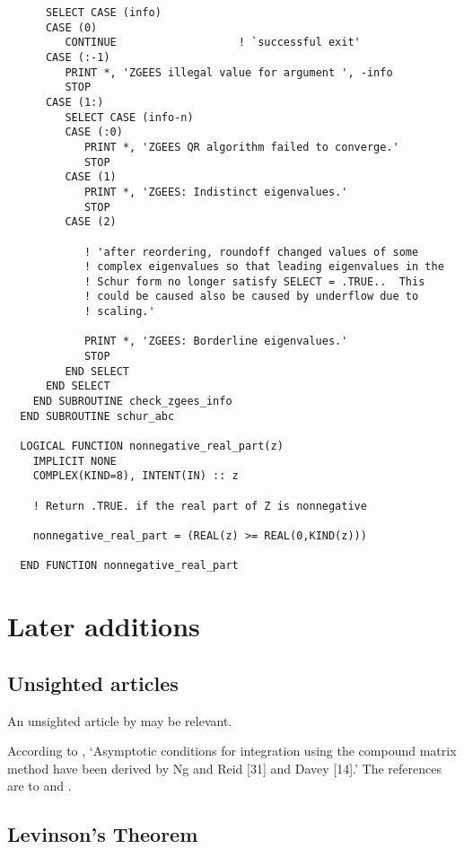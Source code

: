 \documentclass{article}
\begin{document}
\begin{verbatim}
      SELECT CASE (info)
      CASE (0)
         CONTINUE                   ! `successful exit'
      CASE (:-1)
         PRINT *, 'ZGEES illegal value for argument ', -info
         STOP
      CASE (1:)
         SELECT CASE (info-n)
         CASE (:0)
            PRINT *, 'ZGEES QR algorithm failed to converge.'
            STOP
         CASE (1)  
            PRINT *, 'ZGEES: Indistinct eigenvalues.'
            STOP
         CASE (2)

            ! 'after reordering, roundoff changed values of some
            ! complex eigenvalues so that leading eigenvalues in the
            ! Schur form no longer satisfy SELECT = .TRUE..  This
            ! could be caused also be caused by underflow due to
            ! scaling.' 

            PRINT *, 'ZGEES: Borderline eigenvalues.'
            STOP
         END SELECT
      END SELECT
    END SUBROUTINE check_zgees_info
  END SUBROUTINE schur_abc

  LOGICAL FUNCTION nonnegative_real_part(z)
    IMPLICIT NONE
    COMPLEX(KIND=8), INTENT(IN) :: z

    ! Return .TRUE. if the real part of Z is nonnegative

    nonnegative_real_part = (REAL(z) >= REAL(0,KIND(z)))

  END FUNCTION nonnegative_real_part

\end{verbatim}

\section{Later additions}

\subsection{Unsighted articles}

An unsighted article by \citet{Herron87:SIREV-29-597} may be relevant.

According to \citet{Allen02:NM-92-197}, `Asymptotic conditions for
integration using the compound matrix method have been derived by Ng
and Reid [31] and Davey [14].'  The references are to
\citet{Ng80:JCP-38-275} and \citet{Davey82:SMC-137}.

\subsection{Levinson's Theorem}
\label{sec:Levinson}
\end{document}

